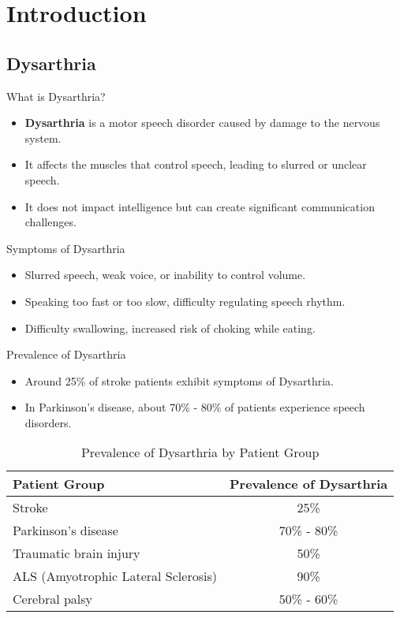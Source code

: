 \section{Introduction}

\subsection{Dysarthria}

\begin{frame}{What is Dysarthria?}
    \begin{itemize}
        \item \textbf{Dysarthria} is a motor speech disorder caused by damage to the nervous system.
        \item It affects the muscles that control speech, leading to slurred or unclear speech.
        \item It does not impact intelligence but can create significant communication challenges.
    \end{itemize}
\end{frame}

\begin{frame}{Symptoms of Dysarthria}
    \begin{itemize}
        \item Slurred speech, weak voice, or inability to control volume.
        \item Speaking too fast or too slow, difficulty regulating speech rhythm.
        \item Difficulty swallowing, increased risk of choking while eating.
    \end{itemize}
   

\end{frame}

\begin{frame}{Prevalence of Dysarthria}
    \begin{itemize}
        \item Around 25\% of stroke patients exhibit symptoms of Dysarthria.
        \item In Parkinson’s disease, about 70\% - 80\% of patients experience speech disorders.
    \end{itemize}
     \begin{table}[]
    \centering
    \begin{tabular}{l c}
        \toprule
        Patient Group & Prevalence of Dysarthria \\
        \midrule
        Stroke & 25\% \\
        Parkinson’s disease & 70\% - 80\% \\
        Traumatic brain injury & 50\% \\
        ALS (Amyotrophic Lateral Sclerosis) & 90\% \\
        Cerebral palsy & 50\% - 60\% \\
        \bottomrule
    \end{tabular}
    \caption{Prevalence of Dysarthria by Patient Group}
\end{table}
\end{frame}

